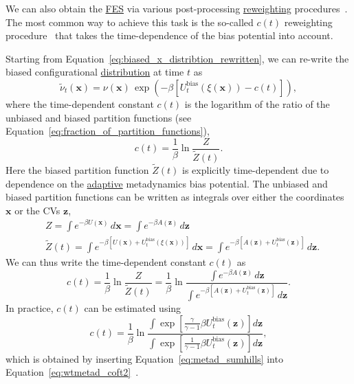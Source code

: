\documentclass[9pt,review]{livecoms}
\newcommand{\vx}{\mathbf{x}}
\newcommand{\vz}{\mathbf{z}}
\begin{document}
We can also obtain the \hyperlink{ref:FES} {FES} via various post-processing \hyperlink{ref:Reweighting} {reweighting} procedures~\cite{bonomi_rewt,tiwary_rewt,Branduardi-JCTC-2012,Schafer_RewMetaD_2020,Giberti_IterRew_JCTC2019,10.1063/1.5123498,10.1016/j.cplett.2020.137384}. The most common way to achieve this task is the so-called $c(t)$ reweighting procedure~\cite{bonomi_rewt,tiwary_rewt} that takes the time-dependence of the bias potential into account.

Starting from Equation~\ref{eq:biased_x_distribtion_rewritten}, we can re-write the biased configurational \hyperlink{ref:Distribution} {distribution} at time $t$ as
\begin{equation}
\label{eq:biased_prob_dist_with_c_of_t}
\tilde{\nu}_{t}(\vx) = \nu(\vx) \, \exp
\left(-\beta\left[
U_{t}^{\mathrm{bias}}(\xi(\vx))-c(t)
\right] \right),
\end{equation}
where the time-dependent constant $c(t)$ is the logarithm of the ratio of the unbiased and biased partition functions (see Equation~\ref{eq:fraction_of_partition_functions}),
\begin{equation}
c(t) =
\frac{1}{\beta} \ln \frac{Z}{\tilde{Z}(t)}.
\end{equation}
Here the biased partition function $\tilde{Z}(t)$ is explicitly time-dependent due to dependence on the \hyperlink{ref:Adaptive} {adaptive} metadynamics bias potential.
The unbiased and biased partition functions can be written as integrals over either the coordinates $\vx$ or the CVs $\vz$,
\begin{align}
& Z = \int e^{-\beta U(\vx) } \, d\vx = \int e^{-\beta A(\vz) } \, d\vz \\
& \tilde{Z}(t) = \int e^{-\beta\left [ U(\vx) + U_{t}^\mathrm{bias}(\xi(\vx)) \right]} \, d\vx = \int e^{-\beta\left [ A(\vz) + U_{t}^\mathrm{bias}(\vz) \right]} \, d\vz.
\end{align}
We can thus write the time-dependent constant $c(t)$ as \begin{equation}
\label{eq:wtmetad_coft2}
c(t) =
\frac{1}{\beta} \ln \frac{Z}{\tilde{Z}(t)} =
\frac{1}{\beta} \ln \frac
{\int e^{-\beta A(\vz)} \,  d\vz }
{\int e^{-\beta \left[ A(\vz) + U_{t}^{\mathrm{bias}}(\vz) \right]} \, d\vz }.
\end{equation}
In practice, $c(t)$ can be estimated using
\begin{equation}
\label{eq:wtmetad_coft_estimate}
c(t) = \frac{1}{\beta} \ln
\frac
{\int \exp \left[ \frac{\gamma}{\gamma-1} \beta U_{t}^{\mathrm{bias}}(\vz)  \right] d\vz }
{\int \exp \left[ \frac{1}{\gamma-1} \beta U_{t}^{\mathrm{bias}}(\vz)  \right] d\vz },
\end{equation}
which is obtained by inserting Equation~\ref{eq:metad_sumhills} into Equation~\ref{eq:wtmetad_coft2}~\cite{tiwary_rewt,Valsson2016_ARPC_MetaD}.
\end{document}
